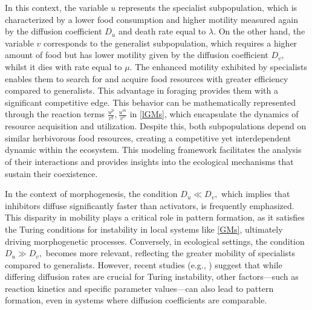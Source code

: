 \documentclass[leqno,12pt]{article}
\numberwithin{equation}{section}
\begin{document}
In this context, the variable $u$ represents the specialist subpopulation, which is characterized by a lower food consumption and higher motility measured again by the diffusion coefficient $D_u$ and death rate equal to $\lambda.$   On the other hand, the variable $v$ corresponds to the generalist subpopulation, which requires a higher amount of food but has lower motility given by the diffusion coefficient $D_v,$ whilst it dies with rate equal to $\mu.$ 
The enhanced motility exhibited by specialists enables them to search for and acquire food resources with greater efficiency compared to generalists. This advantage in foraging provides them with a significant competitive edge. This behavior can be mathematically represented through the reaction terms $\frac{u^p}{v^q}, \frac{u^m}{v^s}$ in \eqref{lGMs}, which encapsulate the dynamics of resource acquisition and utilization.
Despite this, both subpopulations depend on similar herbivorous food resources, creating a competitive yet interdependent dynamic within the ecosystem. This modeling framework facilitates the analysis of their interactions and provides insights into the ecological mechanisms that sustain their coexistence.



In the context of morphogenesis, the condition  $D_u\ll D_v,$ which implies that inhibitors diffuse significantly faster than activators, is frequently emphasized. This disparity in mobility plays a critical role in pattern formation, as it satisfies the Turing conditions for instability in local systems like \eqref{GMs}, ultimately driving morphogenetic processes. Conversely, in ecological settings, the condition $D_u\gg D_v,$
  becomes more relevant, reflecting the greater mobility of specialists compared to generalists. However, recent studies (e.g., \cite{GGW20, SWC21}) suggest that while differing diffusion rates are crucial for Turing instability, other factors—such as reaction kinetics and specific parameter values—can also lead to pattern formation, even in systems where diffusion coefficients are comparable.
\end{document}
